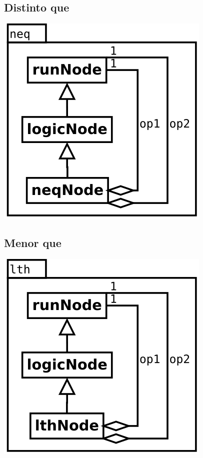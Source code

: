 \subsection {Distinto que}
\begin{center}
\includegraphics[scale=0.4]{neq.png} \\
\end{center}

\subsection {Menor que}
\begin{center}
\includegraphics[scale=0.4]{lth.png} \\
\end{center}

